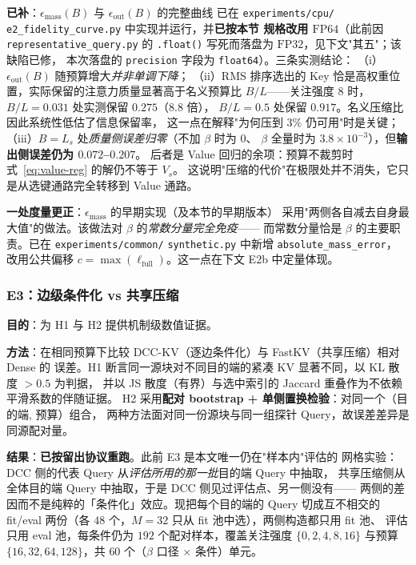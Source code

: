 \textbf{已补}：$\epsilon_{\mathrm{mass}}(B)$ 与 $\epsilon_{\mathrm{out}}(B)$ 的完整曲线
已在 \texttt{experiments/}\allowbreak\texttt{cpu/}\allowbreak
\texttt{e2\_fidelity\_}\allowbreak\texttt{curve.py} 中实现并运行，并\textbf{已按本节
规格改用 $\mathrm{FP64}$}（此前因 \texttt{representative\_query.py} 的
\texttt{.float()} 写死而落盘为 $\mathrm{FP32}$，见下文"其五"；该缺陷已修，
本次落盘的 \texttt{precision} 字段为 \texttt{float64}）。三条实测结论：
（i）$\epsilon_{\mathrm{out}}(B)$ 随预算增大\emph{并非单调下降}；
（ii）RMS 排序选出的 Key 恰是高权重位置，实际保留的注意力质量显著高于名义预算比
$B/L$——关注强度 $8$ 时，$B/L=0.031$ 处实测保留 $0.275$（$8.8$ 倍），
$B/L=0.5$ 处保留 $0.917$。名义压缩比因此系统性低估了信息保留率，
这一点在解释"为何压到 3\% 仍可用"时是关键；
（iii）$B=L_s$ 处\emph{质量侧误差归零}（不加 $\beta$ 时为 $0$、
$\beta$ 全量时为 $3.8\times10^{-3}$），但\textbf{输出侧误差仍为 $0.072$--$0.207$}。
后者是 Value 回归的余项：预算不裁剪时式~\eqref{eq:value-reg} 的解仍不等于 $V_s$。
这说明"压缩的代价"在极限处并不消失，它只是从选键通路完全转移到 Value 通路。

\textbf{一处度量更正}：$\epsilon_{\mathrm{mass}}$ 的早期实现（及本节的早期版本）
采用"两侧各自减去自身最大值"的做法。该做法对 $\beta$ 的\emph{常数分量完全免疫}——
而常数分量恰是 $\beta$ 的主要职责。已在
\texttt{experiments/}\allowbreak\texttt{common/}\allowbreak
\texttt{synthetic.py} 中新增 \texttt{absolute\_}\allowbreak\texttt{mass\_}\allowbreak\texttt{error}，
改用公共偏移 $c=\max(\ell_{\text{full}})$。这一点在下文 E2b 中定量体现。

\subsubsection{E3：边级条件化 vs 共享压缩}

\textbf{目的}：为 H1 与 H2 提供机制级数值证据。

\textbf{方法}：在相同预算下比较 DCC-KV（逐边条件化）与 FastKV（共享压缩）相对 Dense 的
误差。H1 断言同一源块对不同目的端的紧凑 KV 显著不同，以 KL 散度 $> 0.5$ 为判据，
并以 JS 散度（有界）与选中索引的 Jaccard 重叠作为不依赖平滑系数的伴随证据。
H2 采用\textbf{配对 bootstrap + 单侧置换检验}：对同一个（目的端, 预算）组合，
两种方法面对同一份源块与同一组探针 Query，故误差差异是同源配对量。

\textbf{结果}：\textbf{已按留出协议重跑}。此前 E3 是本文唯一仍在"样本内"评估的
网格实验：DCC 侧的代表 Query 从\emph{评估所用的那一批}目的端 Query 中抽取，
共享压缩侧从全体目的端 Query 中抽取，于是 DCC 侧见过评估点、另一侧没有——
两侧的差因而不是纯粹的「条件化」效应。现把每个目的端的 Query 切成互不相交的
fit/eval 两份（各 $48$ 个，$M=32$ 只从 fit 池中选），两侧构造都只用 fit 池、
评估只用 eval 池，每条件仍为 $192$ 个配对样本，覆盖关注强度 $\{0,2,4,8,16\}$
与预算 $\{16,32,64,128\}$，共 $60$ 个（$\beta$ 口径 $\times$ 条件）单元。

